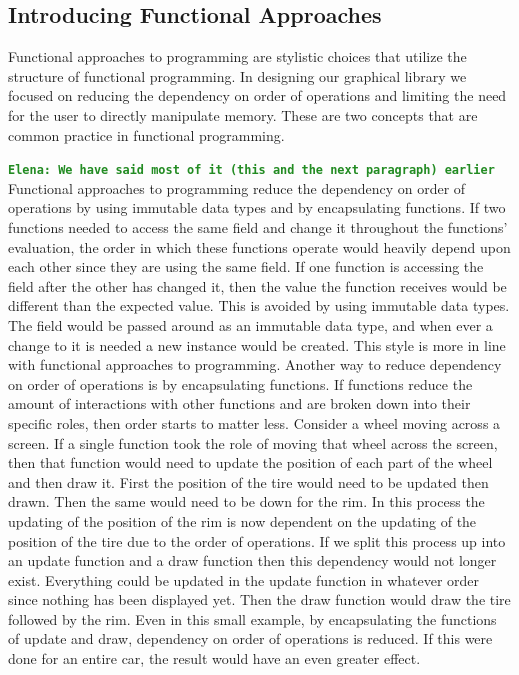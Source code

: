 \documentclass[12pt]{article}
\newcommand{\comment}[1]{{\bf \tt  {#1}}}
\newcommand{\emcomment}[1]{\textcolor{ForestGreen}{\comment{Elena: {#1}}}}
\newcommand{\todo}[1]{\textcolor{blue}{\comment{To Do: {#1}}}}
\begin{document}
\subsection{Introducing Functional Approaches}\label{subsec:functional}
Functional approaches to programming are stylistic choices that utilize the structure of functional programming. In designing our graphical library we focused on reducing the dependency on order of operations and limiting the need for the user to directly manipulate memory. These are two concepts that are common practice in functional programming.

\emcomment{We have said most of it (this and the next paragraph) earlier}
Functional approaches to programming reduce the dependency on order of operations by using immutable data types and by encapsulating functions. If two functions needed to access the same field and change it throughout the functions' evaluation, the order in which these functions operate would heavily depend upon each other since they are using the same field. If one function is accessing the field after the other has changed it, then the value the function receives would be different than the expected value. This is avoided by using immutable data types. The field would be passed around as an immutable data type, and when ever a change to it is needed a new instance would be created. This style is more in line with functional approaches to programming. Another way to reduce dependency on order of operations is by encapsulating functions. If functions reduce the amount of interactions with other functions and are broken down into their specific roles, then order starts to matter less. Consider a wheel moving across a screen. If a single function took the role of moving that wheel across the screen, then that function would need to update the position of each part of the wheel and then draw it. First the position of the tire would need to be updated then drawn. Then the same would need to be down for the rim. In this process the updating of the position of the rim is now dependent on the updating of the position of the tire due to the order of operations. If we split this process up into an update function and a draw function then this dependency would not longer exist. Everything could be updated in the update function in whatever order since nothing has been displayed yet. Then the draw function would draw the tire followed by the rim. Even in this small example, by encapsulating the functions of update and draw, dependency on order of operations is reduced. If this were done for an entire car, the result would have an even greater effect.
\end{document}
